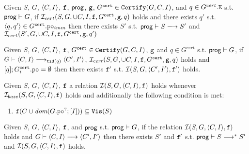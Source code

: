 \documentclass[12pt]{article}
\begin{document}
\begin{lemma}
  Given $S$, $G$, $\langle C, I \rangle$, ${\mathtt{f}}$, $\mathsf{prog}$,
  ${\mathtt{g}}$, $G^{{\mathtt{cert}}} \in {\mathtt{Certify}}(G, C, I)$, and $q \in G^{cert}.{\mathtt{E}}$
  s.t. $\mathsf{prog} \vdash G$,
  if $\mathcal{I}_{cert}(S, G, \cup{C, I}, {\mathtt{f}}, G^{{\mathtt{cert}}}, {\mathtt{g}}, q)$ holds 
  and there exists $q'$ s.t. $\tup{q, q'} \in G^{\cert}.\lPO_{imm}$
  then there exists $S'$ s.t. $\Prog \vdash S \esstep{} S'$ and
  $\mathcal{I}_{cert}(S', G, \cup{C, I}, {\mathtt{f}}, G^{{\mathtt{cert}}}, {\mathtt{g}}, q')$
\end{lemma}

\begin{lemma}
  Given $S$, $G$, $\langle C, I \rangle$, ${\mathtt{f}}$, 
  $G^{{\mathtt{cert}}} \in {\mathtt{Certify}}(G, C, I)$, ${\mathtt{g}}$ and $q \in G^{cert}$
  s.t. $\mathsf{prog} \vdash G$, if $G \vdash \langle C, I \rangle \longrightarrow_{{\mathtt{tid}}(q)} \langle C', I' \rangle$, 
  $\mathcal{I}_{cert}(S, G, \cup{C, I}, {\mathtt{f}}, G^{{\mathtt{cert}}}, {\mathtt{g}}, q)$ holds 
  and $[q];G_{i}^{\cert}.\lPO = \emptyset$ then there exists
  ${\mathtt{f}}'$ s.t. $\mathcal{I}(S, G, \langle C', I' \rangle, {\mathtt{f}}')$ holds.
\end{lemma}

\begin{definition}
  Given $S$, $G$, $\langle C, I \rangle$, ${\mathtt{f}}$ a relation $\mathcal{I}(S, G, \langle C, I \rangle, {\mathtt{f}})$ holds
  whenever $\mathcal{I}_{base}(S, G, \langle C, I \rangle, {\mathtt{f}})$ holds and additionally
  the following condition is met:
  \begin{enumerate}[label=\textbf{S.\arabic*},start=8]
    \item \label{item:sim-vis}
       $\f(C \cup \dom{G.\lPO^?;[I]}) \subseteq \lVIS(S)$
  \end{enumerate}
\end{definition}

\begin{lemma}
  Given $S$, $G$, $\langle C, I \rangle$, ${\mathtt{f}}$, and $\mathsf{prog}$ 
  s.t. $\mathsf{prog} \vdash G$,
  if the relation $\mathcal{I}(S, G, \langle C, I \rangle, {\mathtt{f}})$ holds
  and $G \vdash \langle C, I \rangle \longrightarrow \langle C', I' \rangle$
  then there exists $S'$ and ${\mathtt{f}}'$ s.t.
  $\mathsf{prog} \vdash S \longrightarrow^* S'$ and
  $\mathcal{I}(S, G, \langle C, I \rangle, {\mathtt{f}})$ holds.
\end{lemma}

  

\end{document}
